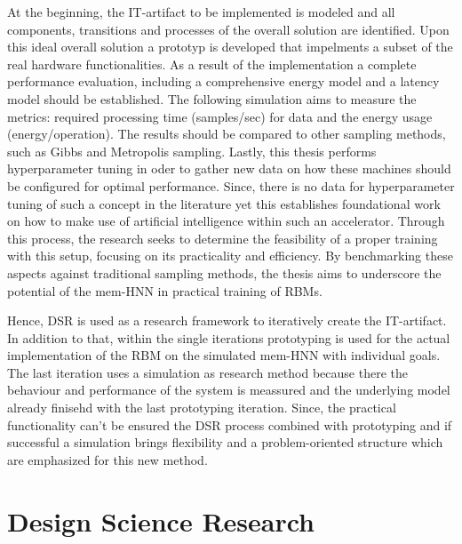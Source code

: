 At the beginning, the \ac{IT}-artifact to be implemented is modeled and all components, transitions and processes of the overall solution are identified.
Upon this ideal overall solution a prototyp is developed that impelments a subset of the real hardware functionalities.
As a result of the implementation a complete performance evaluation, including a comprehensive energy model and a latency model should be established.
The following simulation aims to measure the metrics: required processing time (samples/sec) for data and the energy usage (energy/operation).
The results should be compared to other sampling methods, such as Gibbs and Metropolis sampling.
Lastly, this thesis performs hyperparameter tuning in oder to gather new data on how these machines should be configured for optimal performance.
Since, there is no data for hyperparameter tuning of such a concept in the literature yet this establishes foundational work on how to make use of artificial intelligence within such an accelerator.
Through this process, the research seeks to determine the feasibility of a proper training with this setup, focusing on its practicality and efficiency.
By benchmarking these aspects against traditional sampling methods, the thesis aims to underscore the potential of the \ac{mem-HNN} 
in practical training of \ac{RBM}s.

Hence, \ac{DSR} is used as a research framework to iteratively create the \ac{IT}-artifact. 
In addition to that, within the single iterations prototyping is used for the actual implementation of the \ac{RBM} on the simulated \ac{mem-HNN} with individual goals.
The last iteration uses a simulation as research method because there the behaviour and performance of the system is meassured and the underlying model already finisehd with the last prototyping iteration. 
Since, the practical functionality can't be ensured the \ac{DSR} process combined with prototyping and if successful a simulation 
brings flexibility and a problem-oriented structure which are emphasized for this new method. 

\section{Design Science Research}

